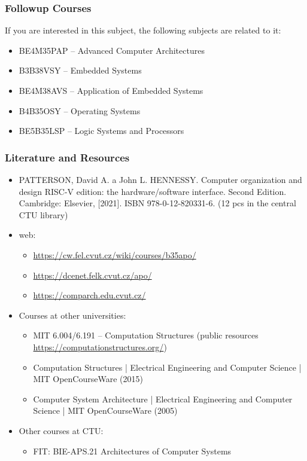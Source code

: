 \documentclass{beamer}
\begin{document}
\begin{frame}
\frametitle{Followup Courses}
If you are interested in this subject, the following subjects are related to it:
\begin{itemize}
\item BE4M35PAP -- Advanced Computer Architectures
\item B3B38VSY -- Embedded Systems
\item BE4M38AVS -- Application of Embedded Systems
\item B4B35OSY -- Operating Systems
\item BE5B35LSP -- Logic Systems and Processors
\end{itemize}
\end{frame}


\begin{frame}
\frametitle{Literature and Resources}
\begin{itemize}
\item PATTERSON, David A. a John L. HENNESSY. Computer organization and design RISC-V edition:
    the hardware/software interface. Second Edition. Cambridge: Elsevier, [2021].
    ISBN 978-0-12-820331-6.
(12 pcs in the central CTU library)
\item web:
\begin{itemize}
\item \url{https://cw.fel.cvut.cz/wiki/courses/b35apo/}
\item \url{https://dcenet.felk.cvut.cz/apo/}
\item \url{https://comparch.edu.cvut.cz/}
\end{itemize}
\item Courses at other universities:
\begin{itemize}
\item MIT 6.004/6.191 – Computation Structures (public resources \url{https://computationstructures.org/})
\item Computation Structures | Electrical Engineering and Computer Science | MIT OpenCourseWare (2015)
\item Computer System Architecture | Electrical Engineering and Computer Science | MIT OpenCourseWare (2005)
\end{itemize}
\item Other courses at CTU:
\begin{itemize}
\item FIT: BIE-APS.21 Architectures of Computer Systems
\end{itemize}

\end{itemize}
\end{frame}
\end{document}
